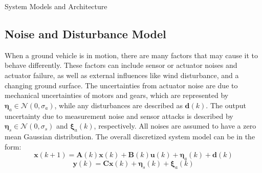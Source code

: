 \begin{section}{System Models and Architecture}
 \subsection{Noise and Disturbance Model}
When a ground vehicle is in motion, there are many factors that may cause it to behave differently. These factors can include sensor or actuator noises and actuator failure, as well as external influences like wind disturbance, and a changing ground surface. The uncertainties from actuator noise are due to mechanical uncertainties of motors and gears, which are represented by $ \bm{\eta}_a \in \mathcal{N}(0,\sigma_a) $, while any disturbances are described as $\bm{d}(k)$. The output uncertainty due to measurement noise and sensor attacks is described by $ \bm{\eta}_s \in \mathcal{N}(0,\sigma_s) $ and $\bm{\xi}_a(k)$, respectively. All noises are assumed to have a zero mean Gaussian distribution. The overall discretized system model can be in the form:
    \begin{equation}
	\bm{x}(k+1)=\bm{A}(k)\bm{x}(k)+\bm{B}(k)\bm{u}(k)+\bm{\eta}_a(k)+\bm{d}(k)
	\end{equation}
	\begin{equation}
	\bm{y}(k)=\bm{C}\bm{x}(k)+\bm{\eta}_s(k)+\bm{\xi}_a(k)
	\end{equation}


\end{section}